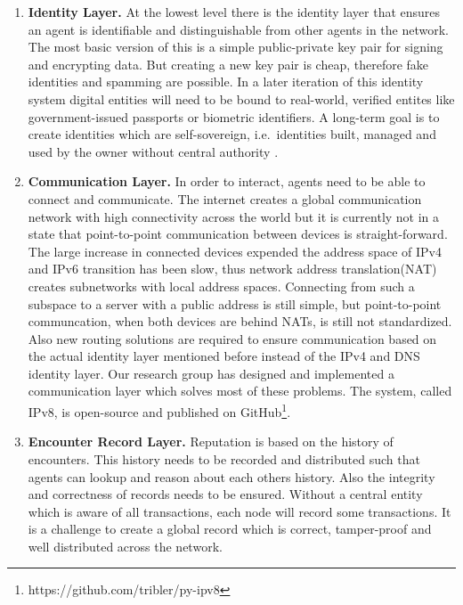 \begin{enumerate}
    \item \textbf{Identity Layer.} At the lowest level there is the identity layer that ensures an agent is 
    identifiable and distinguishable from other agents in the network. The most basic version of this is 
    a simple public-private key pair for signing and encrypting data. But creating a new key pair is cheap, therefore 
    fake identities and spamming are possible. In a later iteration of this identity system digital entities will need to be 
    bound to real-world, verified entites like government-issued passports or biometric identifiers. A long-term
    goal is to create identities which are self-sovereign, i.e.\ identities built, managed and used by the owner without 
    central authority \cite{stokkink2018deployment}.

    \item \textbf{Communication Layer.} In order to interact, agents need to be able to connect and communicate.
    The internet creates a global communication network with high connectivity
    across the world but it is currently not in a state that point-to-point communication between devices is 
    straight-forward. The large increase in connected devices expended the address space of IPv4 and IPv6
    transition has been slow, thus network address translation(NAT) creates subnetworks with local address 
    spaces. Connecting from such a subspace to a server with a public address is still simple, but point-to-point communcation, when both 
    devices are behind NATs, is still not standardized. Also new routing solutions are required to ensure
    communication based on the actual identity layer mentioned before instead of the IPv4 and DNS identity
    layer. Our research group has designed and implemented a communication layer which solves most of 
    these problems. The system, called IPv8, is open-source and published on GitHub\footnote{https://github.com/tribler/py-ipv8}.

    \item \textbf{Encounter Record Layer.} Reputation is based on the history of encounters. This history needs 
    to be recorded and distributed such that agents can lookup and reason about each others history. Also
    the integrity and correctness of records needs to be ensured. Without a central entity
    which is aware of all transactions, each node will record some transactions. It is a challenge to 
    create a global record which is correct, tamper-proof and well distributed across the network.


\end{enumerate}
